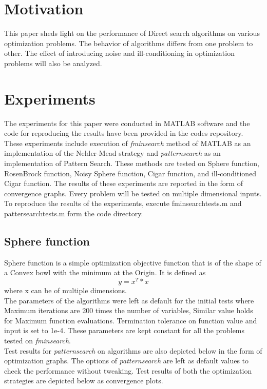 \section{Motivation}
This paper sheds light on the performance of Direct search algorithms on various optimization problems. The behavior of algorithms differs from one problem to other. The effect of introducing noise and ill-conditioning in optimization problems will also be analyzed.

\section{Experiments}
The experiments for this paper were conducted in MATLAB software and the code for reproducing the results have been provided in the codes repository. These experiments include execution of \textit{fminsearch} method of MATLAB as an implementation of the Nelder-Mead strategy and \textit{patternsearch} as an implementation of Pattern Search. These methods are tested on Sphere function, RosenBrock function, Noisy Sphere function, Cigar function, and ill-conditioned Cigar function.
The results of these experiments are reported in the form of convergence graphs. Every problem will be tested on multiple dimensional inputs. To reproduce the results of the experiments, execute fminsearchtests.m and pattersearchtests.m form the code directory.

\subsection{Sphere function}
Sphere function is a simple optimization objective function that is of the shape of a Convex bowl with the minimum at the Origin. It is defined as 
\begin{equation}
  y = x^T*x
\end{equation}
where x can be of multiple dimensions.\\
The parameters of the algorithms were left as default for the initial tests where Maximum iterations are 200 times the number of variables, Similar value holds for Maximum function evaluations. Termination tolerance on function value and input is set to 1e-4. These parameters are kept constant for all the problems tested on \textit{fminsearch}. \\
Test results for \textit{patternsearch} on algorithms are also depicted below in the form of optimization graphs. The options of \textit{patternsearch} are left as default values to check the performance without tweaking. Test results of both the optimization strategies are depicted below as convergence plots.

